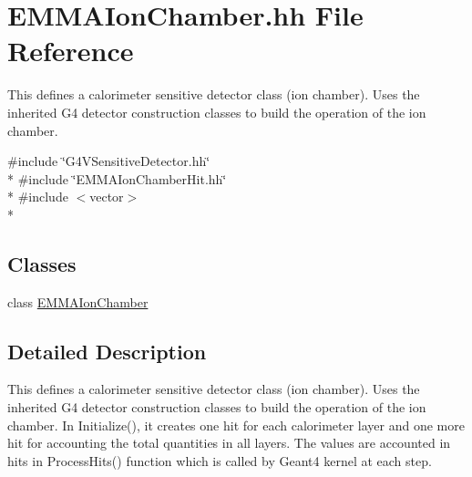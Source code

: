 \hypertarget{EMMAIonChamber_8hh}{\section{E\-M\-M\-A\-Ion\-Chamber.\-hh File Reference}
\label{EMMAIonChamber_8hh}
}


This defines a calorimeter sensitive detector class (ion chamber). Uses the inherited G4 detector construction classes to build the operation of the ion chamber.  


{\ttfamily \#include \char`\"{}G4\-V\-Sensitive\-Detector.\-hh\char`\"{}}\\*
{\ttfamily \#include \char`\"{}E\-M\-M\-A\-Ion\-Chamber\-Hit.\-hh\char`\"{}}\\*
{\ttfamily \#include $<$vector$>$}\\*
\subsection*{Classes}
\begin{DoxyCompactItemize}
\item 
class \hyperlink{classEMMAIonChamber}{E\-M\-M\-A\-Ion\-Chamber}
\end{DoxyCompactItemize}


\subsection{Detailed Description}
This defines a calorimeter sensitive detector class (ion chamber). Uses the inherited G4 detector construction classes to build the operation of the ion chamber. In Initialize(), it creates one hit for each calorimeter layer and one more hit for accounting the total quantities in all layers. The values are accounted in hits in Process\-Hits() function which is called by Geant4 kernel at each step. 